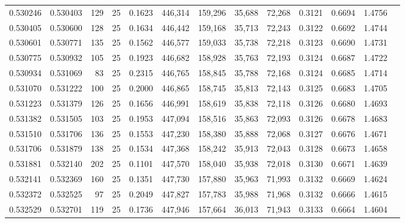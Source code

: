 \begin{tabular}{rrrrrrrrrrrrr}
0.530246 & 0.530403 &   129 &  25 &                                     0.1623 & 446,314 & 159,296 &  35,688 &  72,268 & 0.3121 & 0.6694 & 1.4756 \\
0.530405 & 0.530600 &   128 &  25 &                                     0.1634 & 446,442 & 159,168 &  35,713 &  72,243 & 0.3122 & 0.6692 & 1.4744 \\
0.530601 & 0.530771 &   135 &  25 &                                     0.1562 & 446,577 & 159,033 &  35,738 &  72,218 & 0.3123 & 0.6690 & 1.4731 \\
0.530775 & 0.530932 &   105 &  25 &                                     0.1923 & 446,682 & 158,928 &  35,763 &  72,193 & 0.3124 & 0.6687 & 1.4722 \\
0.530934 & 0.531069 &    83 &  25 &                                     0.2315 & 446,765 & 158,845 &  35,788 &  72,168 & 0.3124 & 0.6685 & 1.4714 \\
0.531070 & 0.531222 &   100 &  25 &                                     0.2000 & 446,865 & 158,745 &  35,813 &  72,143 & 0.3125 & 0.6683 & 1.4705 \\
0.531223 & 0.531379 &   126 &  25 &                                     0.1656 & 446,991 & 158,619 &  35,838 &  72,118 & 0.3126 & 0.6680 & 1.4693 \\
0.531382 & 0.531505 &   103 &  25 &                                     0.1953 & 447,094 & 158,516 &  35,863 &  72,093 & 0.3126 & 0.6678 & 1.4683 \\
0.531510 & 0.531706 &   136 &  25 &                                     0.1553 & 447,230 & 158,380 &  35,888 &  72,068 & 0.3127 & 0.6676 & 1.4671 \\
0.531706 & 0.531879 &   138 &  25 &                                     0.1534 & 447,368 & 158,242 &  35,913 &  72,043 & 0.3128 & 0.6673 & 1.4658 \\
0.531881 & 0.532140 &   202 &  25 &                                     0.1101 & 447,570 & 158,040 &  35,938 &  72,018 & 0.3130 & 0.6671 & 1.4639 \\
0.532141 & 0.532369 &   160 &  25 &                                     0.1351 & 447,730 & 157,880 &  35,963 &  71,993 & 0.3132 & 0.6669 & 1.4624 \\
0.532372 & 0.532525 &    97 &  25 &                                     0.2049 & 447,827 & 157,783 &  35,988 &  71,968 & 0.3132 & 0.6666 & 1.4615 \\
0.532529 & 0.532701 &   119 &  25 &                                     0.1736 & 447,946 & 157,664 &  36,013 &  71,943 & 0.3133 & 0.6664 & 1.4604 \\

\end{tabular}
